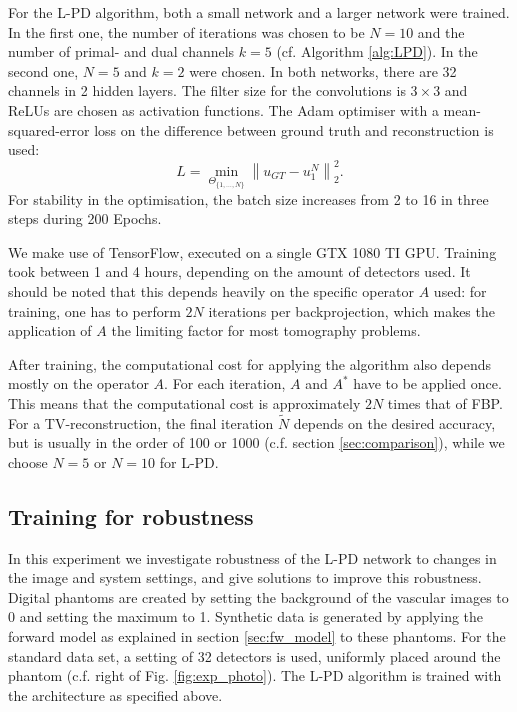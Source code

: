 \documentclass[journal]{IEEEtran}
\newcommand{\norm}[1]{\left\lVert#1\right\rVert}
\begin{document}
For the L-PD algorithm, both a small network and a larger network were trained. In the first one, the number of iterations was chosen to be $N=10$ and the number of primal- and dual channels $k=5$ (cf. Algorithm \ref{alg:LPD}). In the second one, $N=5$ and $k=2$ were chosen. In both networks, there are 32 channels in 2 hidden layers. The filter size for the convolutions is $3\times3$ and ReLUs are chosen as activation functions. The Adam optimiser \cite{Kingma2015} with a mean-squared-error loss on the difference between ground truth and reconstruction is used: 
\begin{equation}\label{eq:Loss_1}
L=\min_{\Theta_{\{1,\dots,N\}}}\norm{u_{GT}-u_1^N}^2_2.
\end{equation}
For stability in the optimisation, the batch size increases from 2 to 16 in three steps \cite{Smith2017} during 200 Epochs. {We make use of TensorFlow, executed on a single GTX 1080 TI GPU. Training took between 1 and 4 hours, depending on the amount of detectors used. It should be noted that this depends heavily on the specific operator $A$ used: for training, one has to perform $2N$ iterations per backprojection, which makes the application of $A$ the limiting factor for most tomography problems. 

After training, the computational cost for applying the algorithm also depends mostly on the operator $A$. For each iteration, $A$ and $A^*$ have to be applied once. This means that the computational cost is approximately $2N$ times that of FBP. For a TV-reconstruction, the final iteration $\tilde{N}$ depends on the desired accuracy, but is usually in the order of 100 or 1000 (c.f. section \ref{sec:comparison}), while we choose $N=5$ or $N=10$ for L-PD.}

\subsection{Training for robustness}\label{sec:robustness}
In this experiment we investigate robustness of the L-PD network to changes in the image and system settings, and give solutions to improve this robustness. Digital phantoms are created by setting the background of the vascular images to 0 and setting the maximum to 1. Synthetic data is generated by applying the forward model as explained in section \ref{sec:fw_model} to these phantoms. For the standard data set, a setting of 32 detectors is used, uniformly placed around the phantom {(c.f. right of Fig. \ref{fig:exp_photo})}. The L-PD algorithm is trained with the architecture as specified above. 
\end{document}
